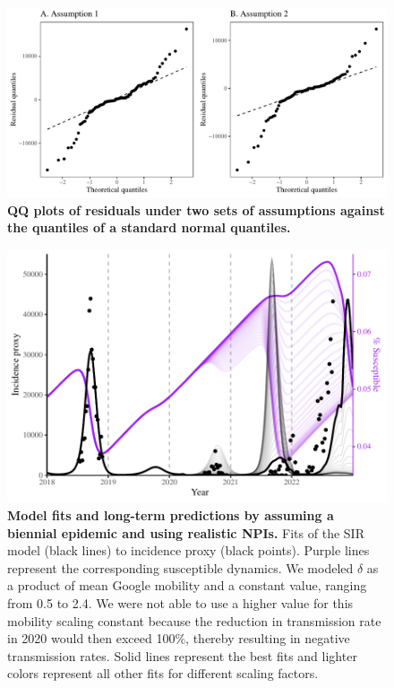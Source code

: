 \documentclass[12pt]{article}
\begin{document}
\pagebreak

\begin{figure}[!th]
\includegraphics[width=\textwidth]{../figure_pub/figure2_qq.pdf}
\caption{
\textbf{QQ plots of residuals under two sets of assumptions against the quantiles of a standard normal quantiles.}
}
\end{figure}

\pagebreak

\begin{figure}[!th]
\includegraphics[width=\textwidth]{../figure_pub/figure2_biennial_mob.pdf}
\caption{
\textbf{Model fits and long-term predictions by assuming a biennial epidemic and using realistic NPIs.}
Fits of the SIR model (black lines) to incidence proxy (black points).
Purple lines represent the corresponding susceptible dynamics.
We modeled $\delta$ as a product of mean Google mobility and a constant value, ranging from 0.5 to 2.4.
We were not able to use a higher value for this mobility scaling constant because the reduction in transmission rate in 2020 would then exceed 100\%, thereby resulting in negative transmission rates.
Solid lines represent the best fits and lighter colors represent all other fits for different scaling factors.
}
\end{figure}


\pagebreak



\end{document}
